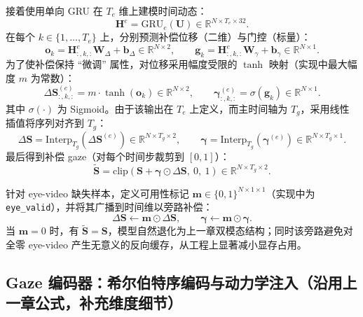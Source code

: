 \documentclass{xdupgthesis}
\begin{document}
接着使用单向 GRU 在 $T_e$ 维上建模时间动态：
\begin{equation}
\mathbf{H}^e=\mathrm{GRU}_e(\mathbf{U})\in\mathbb{R}^{N\times T_e\times 32}.
\end{equation}
在每个 $k\in\{1,\dots,T_e\}$ 上，分别预测补偿位移（二维）与门控（标量）：
\begin{equation}
\mathbf{o}_k=\mathbf{H}^e_{:,k,:}\mathbf{W}_{\Delta}+\mathbf{b}_{\Delta}\in\mathbb{R}^{N\times 2},\qquad
\mathbf{g}_k=\mathbf{H}^e_{:,k,:}\mathbf{W}_{\gamma}+\mathbf{b}_{\gamma}\in\mathbb{R}^{N\times 1}.
\end{equation}
为了使补偿保持 ``微调'' 属性，对位移采用幅度受限的 $\tanh$ 映射（实现中最大幅度 $m$ 为常数）：
\begin{equation}
\Delta\mathbf{S}^{(e)}_{:,k,:}=m\cdot\tanh(\mathbf{o}_k)\in\mathbb{R}^{N\times 2},\qquad
\boldsymbol{\gamma}^{(e)}_{:,k,:}=\sigma(\mathbf{g}_k)\in\mathbb{R}^{N\times 1}.
\end{equation}
其中 $\sigma(\cdot)$ 为 Sigmoid。由于该输出在 $T_e$ 上定义，而主时间轴为 $T_g$，采用线性插值将序列对齐到 $T_g$：
\begin{equation}
\Delta\mathbf{S}=\mathrm{Interp}_{T_g}\!\left(\Delta\mathbf{S}^{(e)}\right)\in\mathbb{R}^{N\times T_g\times 2},\qquad
\boldsymbol{\gamma}=\mathrm{Interp}_{T_g}\!\left(\boldsymbol{\gamma}^{(e)}\right)\in\mathbb{R}^{N\times T_g\times 1}.
\end{equation}
最后得到补偿 gaze（对每个时间步裁剪到 $[0,1]$）：
\begin{equation}
\tilde{\mathbf{S}}=\mathrm{clip}\left(\mathbf{S}+\boldsymbol{\gamma}\odot\Delta\mathbf{S},\ 0,\ 1\right)\in\mathbb{R}^{N\times T_g\times 2}.
\end{equation}

针对 eye-video 缺失样本，定义可用性标记 $\mathbf{m}\in\{0,1\}^{N\times 1\times 1}$（实现中为 \texttt{eye\_valid}），并将其广播到时间维以旁路补偿：
\begin{equation}
\Delta\mathbf{S}\leftarrow \mathbf{m}\odot\Delta\mathbf{S},\qquad
\boldsymbol{\gamma}\leftarrow \mathbf{m}\odot\boldsymbol{\gamma}.
\end{equation}
当 $\mathbf{m}=0$ 时，有 $\tilde{\mathbf{S}}=\mathbf{S}$，模型自然退化为上一章双模态结构；同时该旁路避免对全零 eye-video 产生无意义的反向缓存，从工程上显著减小显存占用。

\subsection{Gaze 编码器：希尔伯特序编码与动力学注入（沿用上一章公式，补充维度细节）}
\end{document}
